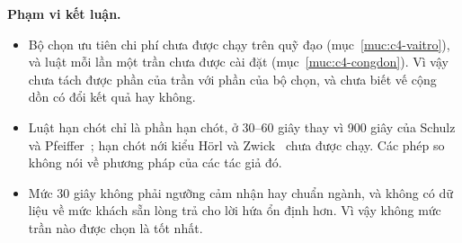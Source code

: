 \textbf{Phạm vi kết luận.}
\begin{itemize}[leftmargin=1.2cm,itemsep=2pt,topsep=3pt]
\item Bộ chọn ưu tiên chi phí chưa được chạy trên quỹ đạo (mục~\ref{muc:c4-vaitro}), và luật mỗi lần một trần chưa
được cài đặt (mục~\ref{muc:c4-congdon}). Vì vậy chưa tách được phần của trần với phần của bộ chọn, và chưa biết vế
cộng dồn có đổi kết quả hay không.
\item Luật hạn chót chỉ là phần hạn chót, ở 30--60 giây thay vì 900 giây của Schulz và Pfeiffer~\cite{schulz2026};
hạn chót nới kiểu Hörl và Zwick~\cite{horl2022} chưa được chạy. Các phép so không nói về phương pháp của các tác giả
đó.
\item Mức 30 giây không phải ngưỡng cảm nhận hay chuẩn ngành, và không có dữ liệu về mức khách sẵn lòng trả cho lời
hứa ổn định hơn. Vì vậy không mức trần nào được chọn là tốt nhất.
\end{itemize}
